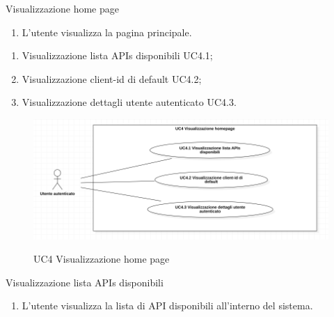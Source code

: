 \begin{usecase}{4}{Visualizzazione home page}\label{uc:visualizzasioen-home-page}

    \usecasemain{}
        \begin{enumerate}
            \item L'utente visualizza la pagina principale.
        \end{enumerate}

        \begin{enumerate}
            \item Visualizzazione lista APIs disponibili UC4.1;
            \item Visualizzazione client-id di default UC4.2;
            \item Visualizzazione dettagli utente autenticato UC4.3.
        \end{enumerate}

\end{usecase}

\begin{figure}[!ht] 
    \centering 
    \includegraphics[width=0.85\columnwidth, alt={Caso d'uso relativo alla visualizzazione della homepage}]{images/usecase/UC4.jpg}
    \caption{UC4 Visualizzazione home page}\label{fig:uc:visualizzazione-home-page}
  \end{figure}

  \pagebreak


\begin{usecase}{4.1}{Visualizzazione lista APIs disponibili}\label{uc:visualizzazione-lista-apis-disponibili}
    \usecasemain{}
        \begin{enumerate}
            \item L'utente visualizza la lista di API disponibili all'interno del sistema.
        \end{enumerate}

\end{usecase}

